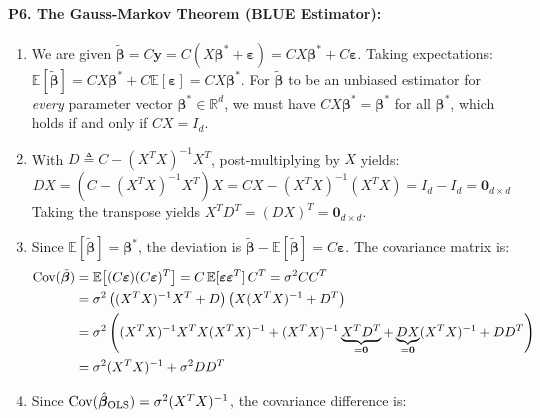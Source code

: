 \paragraph{P6. The Gauss-Markov Theorem (BLUE Estimator):}
\begin{enumerate}[label=(\alph*)]
    \item We are given $\tilde{\boldsymbol{\beta}} = C\mathbf{y} = C(X\boldsymbol{\beta}^* + \boldsymbol{\varepsilon}) = CX\boldsymbol{\beta}^* + C\boldsymbol{\varepsilon}$.
    Taking expectations: $\mathbb{E}[\tilde{\boldsymbol{\beta}}] = CX\boldsymbol{\beta}^* + C\mathbb{E}[\boldsymbol{\varepsilon}] = CX\boldsymbol{\beta}^*$.
    For $\tilde{\boldsymbol{\beta}}$ to be an unbiased estimator for \emph{every} parameter vector $\boldsymbol{\beta}^* \in \mathbb{R}^d$, we must have $CX\boldsymbol{\beta}^* = \boldsymbol{\beta}^*$ for all $\boldsymbol{\beta}^*$, which holds if and only if $CX = I_d$.
    \item With $D \triangleq C - (X^T X)^{-1} X^T$, post-multiplying by $X$ yields:
    \begin{equation*}
    DX = \left( C - (X^T X)^{-1} X^T \right) X = CX - (X^T X)^{-1}(X^T X) = I_d - I_d = \mathbf{0}_{d \times d}
    \end{equation*}
    Taking the transpose yields $X^T D^T = (DX)^T = \mathbf{0}_{d \times d}$.
    \item Since $\mathbb{E}[\tilde{\boldsymbol{\beta}}] = \boldsymbol{\beta}^*$, the deviation is $\tilde{\boldsymbol{\beta}} - \mathbb{E}[\tilde{\boldsymbol{\beta}}] = C\boldsymbol{\varepsilon}$.
    The covariance matrix is:
    \begin{align*}
    \operatorname{Cov}(\tilde{\boldsymbol{\beta}}) &= \mathbb{E}\big[(C\boldsymbol{\varepsilon})(C\boldsymbol{\varepsilon})^T\big] = C\,\mathbb{E}[\boldsymbol{\varepsilon}\boldsymbol{\varepsilon}^T]\,C^T = \sigma^2 C C^T \\
    &= \sigma^2 \left( (X^T X)^{-1} X^T + D \right) \left( X(X^T X)^{-1} + D^T \right) \\
    &= \sigma^2 \left( (X^T X)^{-1} X^T X (X^T X)^{-1} + (X^T X)^{-1} \underbrace{X^T D^T}_{=\mathbf{0}} + \underbrace{DX}_{=\mathbf{0}} (X^T X)^{-1} + DD^T \right) \\
    &= \sigma^2 (X^T X)^{-1} + \sigma^2 DD^T
    \end{align*}
    \item Since $\operatorname{Cov}(\hat{\boldsymbol{\beta}}_{\mathrm{OLS}}) = \sigma^2 (X^T X)^{-1}$, the covariance difference is:
    \begin{equation*}

\end{equation*}
\end{enumerate}
